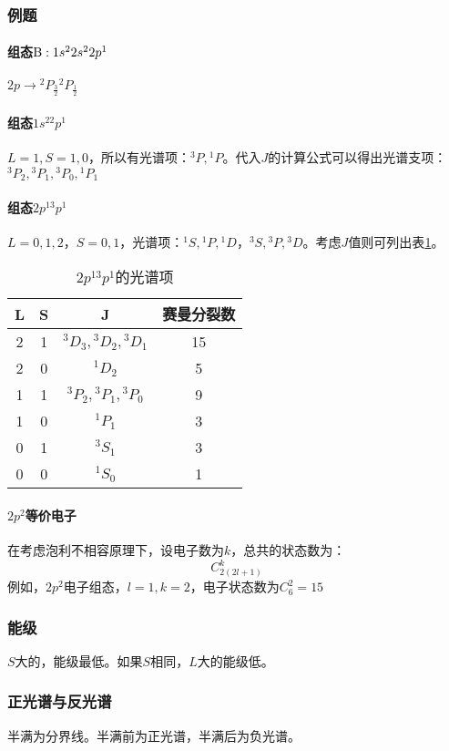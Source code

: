 \subsubsection{例题}


\paragraph{组态$\ce{B}: 1s^22s^22p^1$}

$2p \rightarrow {^2P_{\frac{3}{2}}} {^2P_{\frac{1}{2}}}$

\paragraph{组态$1s^22p^1$}

$L = 1, S = 1, 0$，所以有光谱项：${^3P}, {^1P}$。代入$J$的计算公式可以得出光谱支项：${^3P_2}, {^3P_1}, {^3P_0}, {^1P_1}$

\paragraph{组态$2p^13p^1$}

$L = 0, 1, 2$，$S = 0, 1$，光谱项：${^1S}, {^1P}, {^1D}$，${^3S}, {^3P}, {^3D}$。考虑$J$值则可列出表\ref{tab:spectrum2p13p1}。

\begin{table}[h]
	\centering
	\begin{tabular}{cccc}
		\toprule
		L & S & J                           & 赛曼分裂数 \\
		\midrule
		2 & 1 & ${^3D_3}, {^3D_2}, {^3D_1}$ & 15         \\
		2 & 0 & ${^1D_2}$                   & 5          \\
		1 & 1 & ${^3P_2}, {^3P_1}, {^3P_0}$ & 9          \\
		1 & 0 & ${^1P_1}$                   & 3          \\
		0 & 1 & ${^3S_1}$                   & 3          \\
		0 & 0 & ${^1S_0}$                   & 1          \\
		\bottomrule
	\end{tabular}
	\caption{$2p^13p^1$的光谱项}
	\label{tab:spectrum2p13p1}
\end{table}

\paragraph{$2p^2$等价电子}

在考虑泡利不相容原理下，设电子数为$k$，总共的状态数为：
\begin{equation*}
	C_{2(2l + 1)}^k
\end{equation*}
例如，$2p^2$电子组态，$l=1, k=2$，电子状态数为$C_6^2 = 15$

\subsubsection{能级}

$S$大的，能级最低。如果$S$相同，$L$大的能级低。

\subsubsection{正光谱与反光谱}

半满为分界线。半满前为正光谱，半满后为负光谱。

